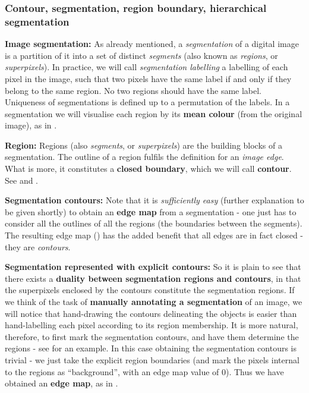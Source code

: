 \subsubsection{Contour, segmentation, region boundary, hierarchical segmentation}
\textbf{Image segmentation:} As already mentioned, a {\it segmentation} of a digital image is a partition of it into a set of distinct {\it segments} (also known as {\it regions}, or {\it superpixels}). In practice, we will call {\it segmentation labelling} a labelling of each pixel in the image, such that two pixels have the same label if and only if %
they belong to the same region. No two regions should have the same label. Uniqueness of segmentations is defined up to a permutation of the labels. In a segmentation we will visualise each region by its {\bf mean colour} (from the original image), as in .

\textbf{Region:} Regions (also {\it segments}, or {\it superpixels}) are the building blocks of a segmentation. The outline %
of a region fulfils the definition for an {\it image edge}. What is more, it constitutes a {\bf closed boundary}, which we will call {\bf contour}. See  and .

\textbf{Segmentation contours:} Note that it is {\it sufficiently easy} (further explanation to be given shortly) to obtain an {\bf edge map} from a segmentation - one just has to consider all the outlines of all the regions %
(the boundaries between the segments). The resulting edge map () has the added benefit that all edges are in fact closed - they are {\it contours}.

\textbf{Segmentation represented with explicit contours:} So it is plain to see that there exists a {\bf duality between segmentation regions and contours}, in that the superpixels enclosed by the contours constitute %
the segmentation regions. 
If we think of the task of {\bf manually annotating a segmentation} of an image, we will notice that hand-drawing the contours delineating the objects is easier than hand-labelling each pixel according to %
its region membership. It is more natural, therefore, to first mark %
the segmentation contours, and have them determine the regions - see  for an example. In this case obtaining the segmentation contours is trivial - we just take the explicit region boundaries (and mark the pixels internal to the regions as ``background'', with an edge map value of 0). Thus we have obtained an {\bf edge map}, as in .


